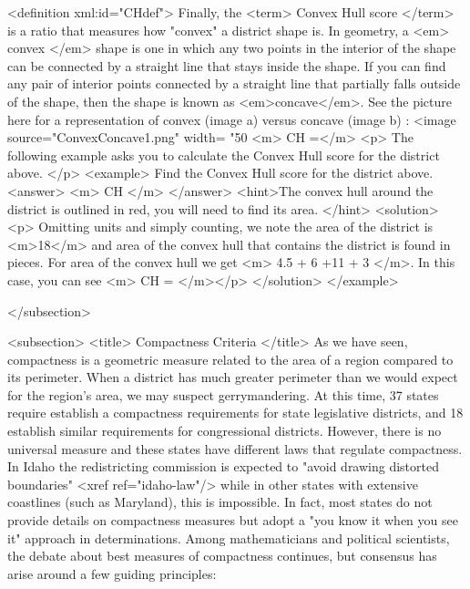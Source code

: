 <definition xml:id="CHdef"> Finally, the <term> Convex Hull score </term> is a ratio that measures how "convex" a district shape is. In geometry, a <em> convex </em> shape is one in which any two points in the interior of the shape can be connected by a straight line that stays inside the shape. If you can find any pair of interior points connected by a straight line that partially falls outside of the shape, then the shape is known as <em>concave</em>. See the picture here for a representation of convex (image a) versus concave (image b) : <image source="ConvexConcave1.png" width= "50%
<m> CH =\displaystyle{}</m>
<p> The following example asks you to calculate the Convex Hull score for the district above. </p> <example> Find the Convex Hull score for the district above.
<answer> <m> CH  </m> </answer>
<hint>The convex hull around the district is outlined in red, you will need to find its area. </hint>
<solution>
<p> Omitting units and simply counting, we note the area of the district is <m>18</m> and area of the convex hull that contains the district is found in pieces. For area of the convex hull we get <m> 4.5 + 6 +11 + 3  </m>.  In this case, you can see <m> CH =   </m></p>
</solution>
</example>




</subsection>

<subsection>
			<title> Compactness Criteria </title>
	As we have seen, compactness is a geometric measure related to the area of a region compared to its perimeter. When a district has much greater perimeter than we would expect for the region's area, we may suspect gerrymandering. At this time, 37 states require establish a compactness requirements for state legislative districts, and 18 establish similar requirements for congressional districts. However, there is no universal measure and these states have different laws that regulate compactness. In Idaho the redistricting commission is expected to "avoid drawing distorted boundaries" <xref ref="idaho-law"/> while in other states with extensive coastlines (such as Maryland), this is impossible. In fact, most states do not provide details on compactness measures but adopt a  "you know it when you see it" approach in determinations. Among mathematicians and political scientists, the debate about best measures of compactness continues, but consensus has arise around a few guiding principles:
	
